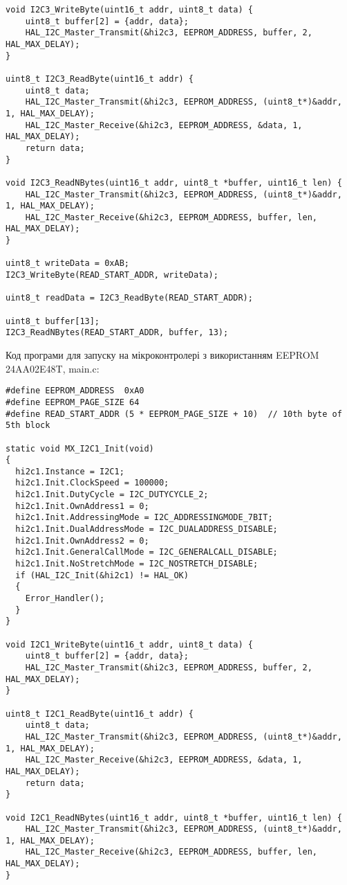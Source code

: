 \documentclass[oneside,14pt]{extarticle}
\begin{document}
\begin{normalsize}
{\begin{lstlisting}
void I2C3_WriteByte(uint16_t addr, uint8_t data) {
    uint8_t buffer[2] = {addr, data};
    HAL_I2C_Master_Transmit(&hi2c3, EEPROM_ADDRESS, buffer, 2, HAL_MAX_DELAY);
}

uint8_t I2C3_ReadByte(uint16_t addr) {
    uint8_t data;
    HAL_I2C_Master_Transmit(&hi2c3, EEPROM_ADDRESS, (uint8_t*)&addr, 1, HAL_MAX_DELAY);
    HAL_I2C_Master_Receive(&hi2c3, EEPROM_ADDRESS, &data, 1, HAL_MAX_DELAY);
    return data;
}

void I2C3_ReadNBytes(uint16_t addr, uint8_t *buffer, uint16_t len) {
    HAL_I2C_Master_Transmit(&hi2c3, EEPROM_ADDRESS, (uint8_t*)&addr, 1, HAL_MAX_DELAY);
    HAL_I2C_Master_Receive(&hi2c3, EEPROM_ADDRESS, buffer, len, HAL_MAX_DELAY);
}
	
uint8_t writeData = 0xAB;
I2C3_WriteByte(READ_START_ADDR, writeData);

uint8_t readData = I2C3_ReadByte(READ_START_ADDR);

uint8_t buffer[13];
I2C3_ReadNBytes(READ_START_ADDR, buffer, 13);\end{lstlisting}}
	
	Код програми для запуску на мікроконтролері з використанням EEPROM 24AA02E48T, main.c:
  
	{\small\begin{lstlisting}
#define EEPROM_ADDRESS  0xA0
#define EEPROM_PAGE_SIZE 64
#define READ_START_ADDR (5 * EEPROM_PAGE_SIZE + 10)  // 10th byte of 5th block

static void MX_I2C1_Init(void)
{
  hi2c1.Instance = I2C1;
  hi2c1.Init.ClockSpeed = 100000;
  hi2c1.Init.DutyCycle = I2C_DUTYCYCLE_2;
  hi2c1.Init.OwnAddress1 = 0;
  hi2c1.Init.AddressingMode = I2C_ADDRESSINGMODE_7BIT;
  hi2c1.Init.DualAddressMode = I2C_DUALADDRESS_DISABLE;
  hi2c1.Init.OwnAddress2 = 0;
  hi2c1.Init.GeneralCallMode = I2C_GENERALCALL_DISABLE;
  hi2c1.Init.NoStretchMode = I2C_NOSTRETCH_DISABLE;
  if (HAL_I2C_Init(&hi2c1) != HAL_OK)
  {
    Error_Handler();
  }
}

void I2C1_WriteByte(uint16_t addr, uint8_t data) {
    uint8_t buffer[2] = {addr, data};
    HAL_I2C_Master_Transmit(&hi2c3, EEPROM_ADDRESS, buffer, 2, HAL_MAX_DELAY);
}

uint8_t I2C1_ReadByte(uint16_t addr) {
    uint8_t data;
    HAL_I2C_Master_Transmit(&hi2c3, EEPROM_ADDRESS, (uint8_t*)&addr, 1, HAL_MAX_DELAY);
    HAL_I2C_Master_Receive(&hi2c3, EEPROM_ADDRESS, &data, 1, HAL_MAX_DELAY);
    return data;
}

void I2C1_ReadNBytes(uint16_t addr, uint8_t *buffer, uint16_t len) {
    HAL_I2C_Master_Transmit(&hi2c3, EEPROM_ADDRESS, (uint8_t*)&addr, 1, HAL_MAX_DELAY);
    HAL_I2C_Master_Receive(&hi2c3, EEPROM_ADDRESS, buffer, len, HAL_MAX_DELAY);
}
	

\end{lstlisting}}
\end{normalsize}
\end{document}
